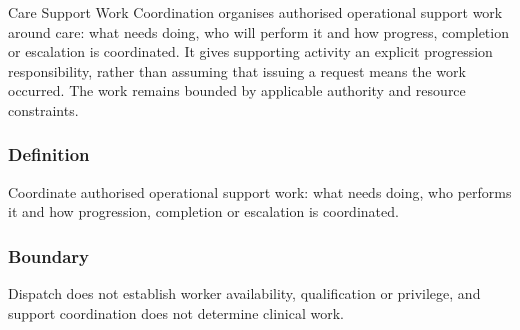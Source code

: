 Care Support Work Coordination organises authorised operational support work around care: what needs doing, who will perform it and how progress, completion or escalation is coordinated. It gives supporting activity an explicit progression responsibility, rather than assuming that issuing a request means the work occurred. The work remains bounded by applicable authority and resource constraints.

\subsubsection*{Definition}

Coordinate authorised operational support work: what needs doing, who performs it and how progression, completion or escalation is coordinated.

\subsubsection*{Boundary}

Dispatch does not establish worker availability, qualification or privilege, and support coordination does not determine clinical work.


